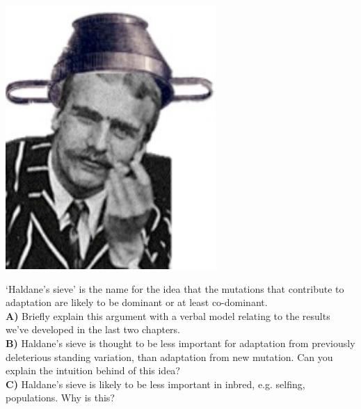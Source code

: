 \begin{marginfigure}
  \begin{center}
    \includegraphics[width=0.6\textwidth]{figures/haldanes_sieve.png}
\end{center}
\caption{} \label{fig:haldanes_sieve}
\end{marginfigure}

\begin{question}
`Haldane's sieve' is the name for the idea that the mutations that contribute to adaptation are likely to be dominant or at least co-dominant. \\
{\bf A)} Briefly explain this argument with a verbal model relating to the
results we’ve developed in the last two chapters. \\
{\bf B)} Haldane’s sieve is thought to be less important for adaptation from previously deleterious standing variation, than adaptation from new mutation. Can you explain the intuition behind of this idea?\\
{\bf C)} Haldane’s sieve is likely to be less important in inbred,
e.g. selfing, populations. Why is this? \\

\end{question}


